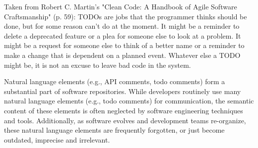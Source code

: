 Taken from Robert C. Martin's "Clean Code: A Handbook of Agile Software Craftsmanship" (p. 59):
TODOs are jobs that the programmer thinks should be done, but for some reason can't do at the moment. It might be a reminder to delete a deprecated feature or a plea for someone else to look at a problem. It might be a request for someone else to think of a better name or a reminder to make a change that is dependent on a planned event. Whatever else a TODO might be, it is not an excuse to leave bad code in the system.



\cite{nie_natural_2018}
Natural language elements (e.g., API comments, todo comments) form a substantial part of software repositories. While developers routinely use many natural language elements (e.g., todo comments) for communication, the semantic content of these elements is often neglected by software engineering techniques and tools. Additionally, as software evolves and development teams re-organize, these natural language elements are frequently forgotten, or just become outdated, imprecise and irrelevant.

